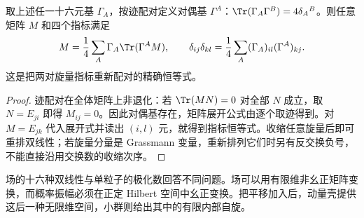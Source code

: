 \begin{proposition}
取上述任一十六元基 $\Gamma_A$，按迹配对定义对偶基 $\Gamma^A$：$\Tr(\Gamma_A\Gamma^B)=4\delta_A{}^B$。则任意矩阵 $M$ 和四个指标满足
\[
 M=\frac14\sum_A\Gamma_A\Tr(\Gamma^A M),\qquad
 \delta_{ij}\delta_{kl}=\frac14\sum_A(\Gamma_A)_{il}(\Gamma^A)_{kj}.
\]
这是把两对旋量指标重新配对的精确恒等式。
\end{proposition}
\begin{proof}
迹配对在全体矩阵上非退化：若 $\Tr(MN)=0$ 对全部 $N$ 成立，取 $N=E_{ji}$ 即得 $M_{ij}=0$。因此对偶基存在，矩阵展开公式由逐个取迹得到。对 $M=E_{jk}$ 代入展开式并读出 $(i,l)$ 元，就得到指标恒等式。收缩任意旋量后即可重排双线性；若旋量分量是 Grassmann 变量，重新排列它们时另有反交换负号，不能直接沿用交换数的收缩次序。
\end{proof}

场的十六种双线性与单粒子的极化数回答不同问题。场可以用有限维非幺正矩阵变换，而概率振幅必须在正定 Hilbert 空间中幺正变换。把平移加入后，动量壳提供这后一种无限维空间，小群则给出其中的有限内部自旋。
